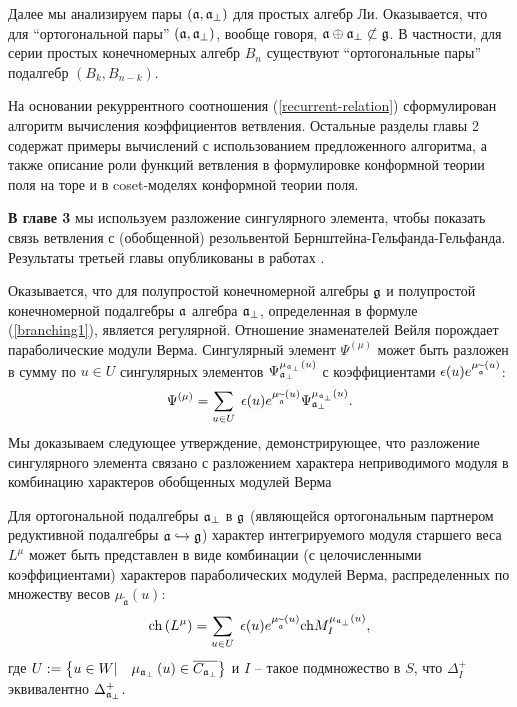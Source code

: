 \documentclass[14pt,autoref,href,facsimile
]{disser}
\begin{document}
Далее мы анализируем пары $(\mathfrak{a},\mathfrak{a}_{\perp})$ для простых алгебр Ли. Оказывается, что для ``ортогональной пары'' $(\mathfrak{a},\mathfrak{a}_{\perp})$, вообще говоря, $\mathfrak{a}\oplus\mathfrak{a}_{\perp}\not\subset\mathfrak{g} $. В частности, для серии простых конечномерных алгебр $B_n$ существуют ``ортогональные пары'' подалгебр $(B_k,B_{n-k})$.

На основании рекуррентного соотношения (\ref{recurrent-relation}) сформулирован алгоритм вычисления коэффициентов ветвления. Остальные разделы главы 2 содержат примеры вычислений с использованием предложенного алгоритма, а также описание роли функций ветвления в формулировке конформной теории поля на торе и в coset-моделях конформной теории поля. 


\textbf{В главе 3} мы используем  разложение сингулярного элемента, чтобы показать связь ветвления с (обобщенной) резольвентой Бернштейна-Гельфанда-Гельфанда.   Результаты третьей главы опубликованы в работах .

Оказывается, что для полупростой конечномерной алгебры $\mathfrak{g}$  и полупростой конечномерной подалгебры $\mathfrak{a}$ алгебра $\mathfrak{a}_{\perp}$, определенная в формуле (\ref{branching1}), является регулярной. Отношение знаменателей Вейля порождает параболические модули Верма. Сингулярный элемент  $\Psi ^{\left( \mu \right) }$ может быть разложен в сумму по  $u\in U$  сингулярных элементов $\Psi _{\mathfrak{a}_{\perp}}^{\mu _{\mathfrak{a}_{\perp}}\left( u\right) }$ с коэффициентами
$\epsilon (u)e^{\mu _{\widetilde{\mathfrak{a}}}\left( u\right) }$:
\begin{equation}
\Psi ^{\left( \mu \right) }=\sum_{u\in U}\;\epsilon (u)e^{\mu _{\widetilde{%
\mathfrak{a}}}\left( u\right) }\Psi _{\frak{a}_{\perp }}^{\mu _{\frak{a}%
_{\perp }}\left( u\right) }.  \label{sing decomp main}
\end{equation}
Мы доказываем следующее утверждение, демонстрирующее, что разложение сингулярного элемента связано с разложением характера неприводимого модуля в комбинацию характеров обобщенных модулей Верма
\begin{statement}
Для ортогональной подалгебры  $\frak{a}_{\perp }$ в $\frak{g}$ (являющейся ортогональным партнером редуктивной подалгебры $\frak{a}\hookrightarrow \frak{g}$) характер интегрируемого модуля старшего веса  $L^{\mu }$ может быть представлен в виде комбинации (с целочисленными коэффициентами) характеров параболических модулей Верма, распределенных по множеству весов $\mu _{\widetilde{\mathfrak{a}}}\left(
u\right)$:
\begin{equation}
\mathrm{ch}\left( L^{\mu }\right) =\sum_{u\in U}\;\epsilon (u)e^{\mu _{%
\widetilde{\frak{a}}}\left( u\right) }\mathrm{ch}M_{I}^{\mu _{\frak{a}%
_{\perp }}\left( u\right) },  \label{gen Weyl-Verma}
\end{equation}
где  $U:=\left\{ u\in W|\quad \mu _{\frak{a}_{\perp }}\left( u\right) \in
\overline{C_{\frak{a}_{\perp }}}\right\} $ и $I$ -- такое подмножество в  $S$, что $\Delta _{I}^{+}$ эквивалентно $\Delta _{\frak{a}_{\perp }}^{+}$.
\end{statement}
\end{document}
